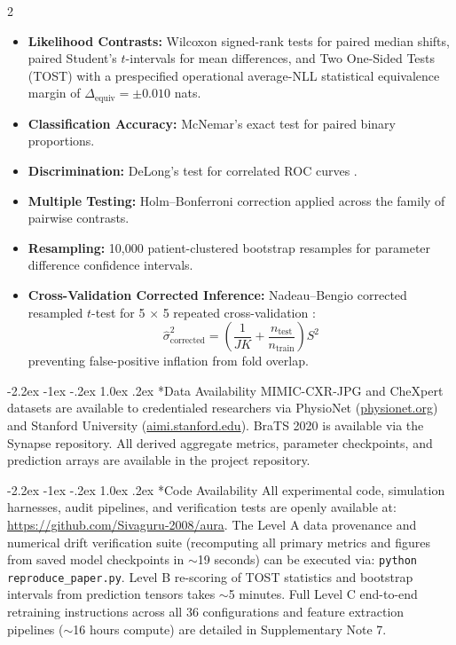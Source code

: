 \documentclass[10pt,a4paper,twoside]{article}
\makeatletter
\renewcommand{\section}{\@startsection{section}{1}{\z@}%
  {-2.2ex \@plus -1ex \@minus -.2ex}%
  {1.0ex \@plus.2ex}%
  {\normalfont\large\sffamily\bfseries\color{naturedark}}}
\makeatother
\begin{document}
\begin{multicols}{2}
\begin{itemize}
  \setlength{\itemsep}{1pt}
  \item \textbf{Likelihood Contrasts:} Wilcoxon signed-rank tests for paired median shifts, paired Student's $t$-intervals for mean differences, and Two One-Sided Tests (TOST) with a prespecified operational average-NLL statistical equivalence margin of $\Delta_{\text{equiv}} = \pm 0.010$ nats.
  \item \textbf{Classification Accuracy:} McNemar's exact test for paired binary proportions.
  \item \textbf{Discrimination:} DeLong's test for correlated ROC curves \cite{delong1988}.
  \item \textbf{Multiple Testing:} Holm--Bonferroni correction applied across the family of pairwise contrasts.
  \item \textbf{Resampling:} 10,000 patient-clustered bootstrap resamples for parameter difference confidence intervals.
  \item \textbf{Cross-Validation Corrected Inference:} Nadeau--Bengio corrected resampled $t$-test for 5 $\times$ 5 repeated cross-validation \cite{nadeau2003}:
  \begin{equation}
  \hat{\sigma}^2_{\text{corrected}} = \left(\frac{1}{JK} + \frac{n_{\text{test}}}{n_{\text{train}}}\right) S^2
  \end{equation}
  preventing false-positive inflation from fold overlap.
\end{itemize}

\section*{Data Availability}
MIMIC-CXR-JPG and CheXpert datasets are available to credentialed researchers via PhysioNet (\url{physionet.org}) and Stanford University (\url{aimi.stanford.edu}). BraTS 2020 is available via the Synapse repository. All derived aggregate metrics, parameter checkpoints, and prediction arrays are available in the project repository.

\section*{Code Availability}
All experimental code, simulation harnesses, audit pipelines, and verification tests are openly available at: \url{https://github.com/Sivaguru-2008/aura}. The Level A data provenance and numerical drift verification suite (recomputing all primary metrics and figures from saved model checkpoints in $\sim$19 seconds) can be executed via: \texttt{python reproduce\_paper.py}. Level B re-scoring of TOST statistics and bootstrap intervals from prediction tensors takes $\sim$5 minutes. Full Level C end-to-end retraining instructions across all 36 configurations and feature extraction pipelines ($\sim$16 hours compute) are detailed in Supplementary Note 7.


\end{multicols}
\end{document}
